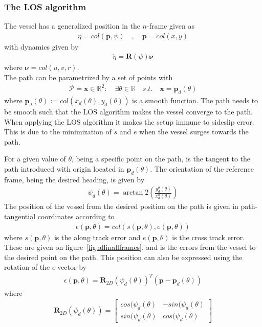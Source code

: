 \subsubsection{The \ac{LOS} algorithm}
The vessel has a generalized position in the ${n}$-frame given as
\begin{align}
\eta = col(\textbf{p},\psi)\quad , \quad \textbf{p} = col(x,y)
\end{align}
with dynamics given by
\begin{align}
\dot{\eta} = \textbf{R}(\psi)\boldsymbol{\nu}
\end{align}
where $\boldsymbol{\nu} = col(u,v,r)$.\\
The path can be parametrized by a set of points with
\begin{align}
\mathcal{P} = {\textbf{x}}\in\mathds{R}^2 : \quad \exists \theta \in \mathds{R} \quad s.t. \quad \textbf{x} = \textbf{p}_d(\theta)
\end{align}
where $\textbf{p}_d(\theta) := col(x_d(\theta),y_d(\theta))$ is a smooth function. The path needs to be smooth such that the \ac{LOS} algorithm makes the vessel converge to the path. When applying the \ac{LOS} algorithm it makes the setup immune to sideslip error. This is due to the minimization of $s$ and $e$ when the vessel surges towards the path.

For a given value of $\theta$, being a specific point on the path, is the tangent to the path introduced with origin located in $\textbf{p}_d(\theta)$. The orientation of the reference frame, being the desired heading, is given by
\begin{align}
\psi_d(\theta) = \arctan2\left(\frac{y_d^\theta(\theta)}{x_d^\theta(\theta)}\right)
\end{align}
The position of the vessel from the desired position on the path is given in path-tangential coordinates according to
\begin{align}
\epsilon(\textbf{p},\theta) = col(s(\textbf{p},\theta),e(\textbf{p},\theta))
\end{align}
where $s(\textbf{p},\theta)$ is the along track error and $e(\textbf{p},\theta)$ is the cross track error. These are given on figure~\vref{fig:allinallframes}, and is the errors from the vessel to the desired point on the path. This position can also be expressed using the rotation of the $\epsilon$-vector by
\begin{align}
\epsilon(\textbf{p},\theta) = \textbf{R}_{2D}(\psi_d(\theta))^T(\textbf{p}-\textbf{p}_d(\theta))
\end{align}
where
\begin{align}
\textbf{R}_{2D}(\psi_d(\theta)) = 
\begin{bmatrix}
cos(\psi_d(\theta) & -sin(\psi_d(\theta)\\
sin(\psi_d(\theta) & cos(\psi_d(\theta)
\end{bmatrix}
\end{align}